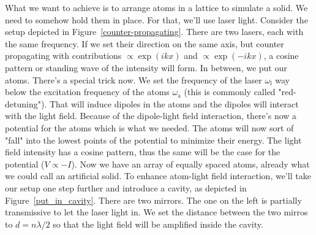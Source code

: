 What we want to achieve is to arrange atoms in a lattice to simulate a solid. We need to somehow hold them in place. For that, we'll use laser light. Consider the setup depicted in Figure~\ref{counter-propagating}. There are two lasers, each with the same frequency. If we set their direction on the same axis, but counter propagating with contributions $\propto \exp(ikx)$ and $\propto \exp(-ikx)$, a cosine pattern or standing wave of the intensity will form. In between, we put our atoms. There's a special trick now. We set the frequency of the laser $\omega_\text{l}$ way below the excitation frequency of the atoms $\omega_\text{a}$ (this is commonly called "red-detuning"). That will induce dipoles in the atoms and the dipoles will interact with the light field. Because of the dipole-light field interaction, there's now a potential for the atoms which is what we needed. The atoms will now sort of "fall" into the lowest points of the potential to minimize their energy. The light field intensity has a cosine pattern, thus the same will be the case for the potential ($V \propto -I$). Now we have an array of equally spaced atoms, already what we could call an artificial solid. To enhance atom-light field interaction, we'll take our setup one step further and introduce a cavity, as depicted in Figure~\ref{put_in_cavity}. There are two mirrors. The one on the left is partially transmissive to let the laser light in. We set the distance between the two mirros to $d = n \lambda / 2$ so that the light field will be amplified inside the cavity.

